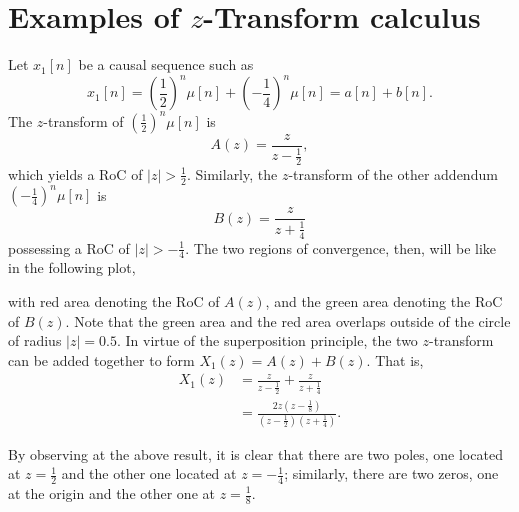 \documentclass[\documentfontsize, twocolumn]{\classname}
\begin{document}
\section{Examples of $z$-Transform calculus}
Let $x_1[n]$ be a causal sequence such as\cite{bib:zTransformExamples}
\[
    x_1[n] = \left(\frac 1 2\right)^n \mu[n] + \left(-\frac 1 4\right)^n \mu[n] = a[n] + b[n].
\]
The $z$-transform of $\left(\frac 1 2\right)^n \mu[n]$ is
\[
    A(z) = \frac{z}{z-\frac 1 2},
\]
which yields a RoC of $|z| > \frac 1 2$. Similarly, the $z$-transform of the other addendum $\left(-\frac 1 4\right)^n \mu[n]$ is
\[
    B(z) = \frac{z}{z+\frac 1 4}
\]
possessing a RoC of $|z| > - \frac 1 4$. The two regions of convergence, then, will be like in the following plot,
\begin{center}
\end{center}
with red area denoting the RoC of $A(z)$, and the green area denoting the RoC of $B(z)$. Note that the green area and the red area overlaps outside of the circle of radius $|z| = 0.5$. In virtue of the superposition principle, the two $z$-transform can be added together to form $X_1(z) = A(z) + B(z)$. That is,
\begin{align*}
    X_1(z)  &= \frac{z}{z - \frac 1 2} + \frac{z}{z + \frac 1 4} \\
            &= \frac {
                2z \left(z - \frac 1 8\right)
            } {
                \left(z - \frac 1 2\right) \left(z + \frac 1 4\right)
            }.
\end{align*}

By observing at the above result, it is clear that there are two poles, one located at $z=\frac 1 2$ and the other one located at $z = - \frac 1 4$; similarly, there are two zeros, one at the origin and the other one at $z = \frac 1 8$.
\end{document}
